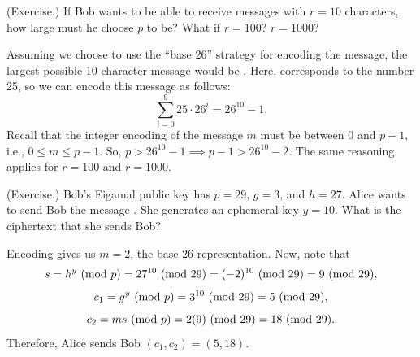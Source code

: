\documentclass[letterpaper]{article}
\begin{document}
\begin{mdframed}
    (Exercise.) If Bob wants to be able to receive messages with $r = 10$ characters, how large must he choose $p$ to be? What if $r = 100$? $r = 1000$? 

    \begin{mdframed}
        Assuming we choose to use the ``base 26'' strategy for encoding the message, the largest possible 10 character message would be . Here,  corresponds to the number 25, so we can encode this message as follows: \[\sum_{i = 0}^{9} 25 \cdot 26^i = 26^{10} - 1.\] Recall that the integer encoding of the message $m$ must be between 0 and $p - 1$, i.e., $0 \leq m \leq p - 1$. So, $p > 26^{10} - 1 \implies p -1 > 26^{10} - 2$. The same reasoning applies for $r = 100$ and $r = 1000$. 
    \end{mdframed}
\end{mdframed}

\begin{mdframed}
    (Exercise.) Bob's Eigamal public key has $p = 29$, $g = 3$, and $h = 27$. Alice wants to send Bob the message . She generates an ephemeral key $y = 10$. What is the ciphertext that she sends Bob? 

    \begin{mdframed}
        Encoding  gives us $m = 2$, the base 26 representation. Now, note that 
        \[s = h^y \ (\mathrm{mod}\ p) = 27^{10} \ (\mathrm{mod}\ 29) = (-2)^{10} \ (\mathrm{mod}\ 29) = 9 \ (\mathrm{mod}\ 29),\]
        \[c_1 = g^y \ (\mathrm{mod}\ p) = 3^{10} \ (\mathrm{mod}\ 29) = 5 \ (\mathrm{mod}\ 29),\]
        \[c_2 = ms \ (\mathrm{mod}\ p) = 2(9) \ (\mathrm{mod}\ 29) = 18 \ (\mathrm{mod}\ 29).\]
        Therefore, Alice sends Bob $(c_1, c_2) = (5, 18)$.
    \end{mdframed}
\end{mdframed}
\end{document}
